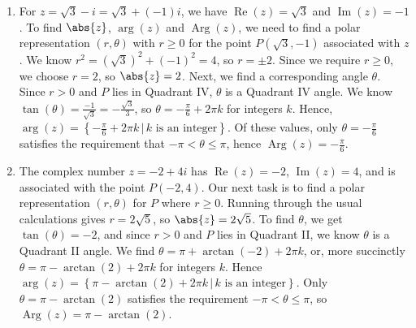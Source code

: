{
\begin{enumerate}

\item For $z = \sqrt{3} -i = \sqrt{3} + (-1)i$, we have $\operatorname{Re}(z) = \sqrt{3}$ and $\operatorname{Im}(z) = -1$.   To find $\abs{z}$, $\operatorname{arg}(z)$ and $\operatorname{Arg}(z)$, we need to find a polar representation $(r,\theta)$ with $r \geq 0$ for the point $P(\sqrt{3},-1)$ associated with $z$.   We know $r^2 = (\sqrt{3})^2 + (-1)^2 = 4$, so $r = \pm 2$.  Since we require $r \geq 0$, we choose $r =2$, so $\abs{z} = 2$.  Next, we find a corresponding angle $\theta$.  Since $r>0$ and $P$ lies in Quadrant IV, $\theta$ is a Quadrant IV angle.  We know $\tan(\theta) = \frac{-1}{\sqrt{3}} = -\frac{\sqrt{3}}{3}$, so $\theta = -\frac{\pi}{6} + 2\pi k$ for integers $k$.  Hence, $\operatorname{arg}(z) = \left\{-\frac{\pi}{6} + 2\pi k \, | \, \text{$k$ is an integer} \right\}$. Of these values, only  $\theta = -\frac{\pi}{6}$  satisfies the requirement that $-\pi < \theta \leq \pi$, hence $\operatorname{Arg}(z) = -\frac{\pi}{6}$.  



\item The complex number $z = -2+4i$ has  $\operatorname{Re}(z) = -2$,   $\operatorname{Im}(z) = 4$, and is associated with the point $P(-2,4)$.  Our next task is to find a polar representation $(r,\theta)$ for $P$ where $r \geq 0$. Running through the usual calculations gives $r = 2\sqrt{5}$, so $\abs{z} = 2\sqrt{5}$.  To find $\theta$, we get $\tan(\theta) = -2$, and since $r > 0$ and $P$ lies in Quadrant II, we know $\theta$  is a Quadrant II angle.  We find $\theta = \pi + \arctan(-2) + 2\pi k$, or, more succinctly  $\theta = \pi - \arctan(2) + 2\pi k$ for integers $k$.  Hence $\operatorname{arg}(z) = \left\{\pi - \arctan(2) + 2\pi k \, | \, \text{$k$ is an integer}\right\}$.  Only  $\theta = \pi - \arctan(2)$ satisfies the requirement $-\pi < \theta \leq \pi$,  so $\operatorname{Arg}(z) = \pi - \arctan(2)$. 


\end{enumerate}}
